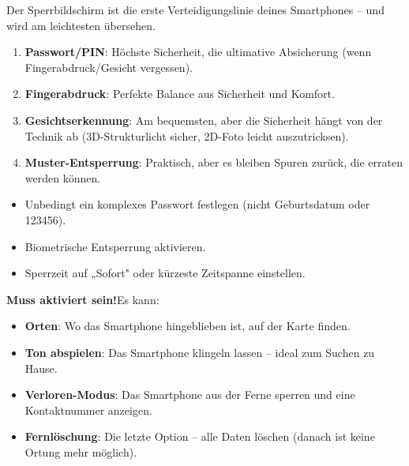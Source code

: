 


Der Sperrbildschirm ist die erste Verteidigungslinie deines Smartphones – und wird am leichtesten übersehen.


\begin{enumerate}
  \item \textbf{Passwort/PIN}: Höchste Sicherheit, die ultimative Absicherung (wenn Fingerabdruck/Gesicht vergessen).
  \item \textbf{Fingerabdruck}: Perfekte Balance aus Sicherheit und Komfort.
  \item \textbf{Gesichtserkennung}: Am bequemsten, aber die Sicherheit hängt von der Technik ab (3D-Strukturlicht sicher, 2D-Foto leicht auszutricksen).
  \item \textbf{Muster-Entsperrung}: Praktisch, aber es bleiben Spuren zurück, die erraten werden können.
\end{enumerate}


\begin{itemize}
  \item Unbedingt ein komplexes Passwort festlegen (nicht Geburtsdatum oder 123456).
  \item Biometrische Entsperrung aktivieren.
  \item Sperrzeit auf „Sofort" oder kürzeste Zeitspanne einstellen.
\end{itemize}


\textbf{Muss aktiviert sein!}Es kann:

\begin{itemize}
  \item \textbf{Orten}: Wo das Smartphone hingeblieben ist, auf der Karte finden.
  \item \textbf{Ton abspielen}: Das Smartphone klingeln lassen – ideal zum Suchen zu Hause.
  \item \textbf{Verloren-Modus}: Das Smartphone aus der Ferne sperren und eine Kontaktnummer anzeigen.
  \item \textbf{Fernlöschung}: Die letzte Option – alle Daten löschen (danach ist keine Ortung mehr möglich).
\end{itemize}

